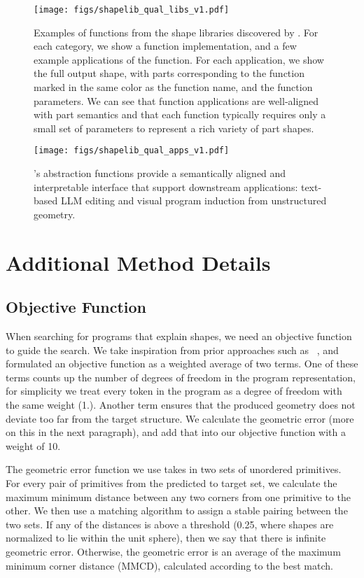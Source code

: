 
\begin{figure*}[t!]
\centering
  \texttt{[image: figs/shapelib\_qual\_libs\_v1.pdf]}
   \caption{Examples of functions from the shape libraries discovered by \methodname. For each category, we show a function implementation, and a few example applications of the function. For each application, we show the full output shape, with parts corresponding to the function marked in the same color as the function name, and the function parameters. We can see that function applications are well-aligned with part semantics and that each function typically requires only a small set of parameters to represent a rich variety of part shapes.} 
  \label{fig:big_qual_libs}
\end{figure*}

\begin{figure*}[t!]
\centering
  \texttt{[image: figs/shapelib\_qual\_apps\_v1.pdf]}
   \caption{\methodname's abstraction functions provide a semantically aligned and interpretable interface that support downstream applications: text-based LLM editing and visual program induction from unstructured geometry. } 
  \label{fig:big_qual_apps}
\end{figure*}


\section{Additional Method Details}

\subsection{Objective Function }

When searching for programs that explain shapes, we need an objective function to guide the search. 
We take inspiration from prior approaches such as ~\cite{jones2023shapecoder}, and formulated an objective function as a weighted average of two terms.
One of these terms counts up the number of degrees of freedom in the program representation, for simplicity we treat every token in the program as a degree of freedom with the same weight (1.).
Another term ensures that the produced geometry does not deviate too far from the target structure. 
We calculate the geometric error (more on this in the next paragraph), and add that into our objective function with a weight of 10.

The geometric error function we use takes in two sets of unordered primitives. 
For every pair of primitives from the predicted to target set, we calculate the maximum minimum distance between any two corners from one primitive to the other. 
We then use a matching algorithm to assign a stable pairing between the two sets.
If any of the distances is above a threshold (0.25, where shapes are normalized to lie within the unit sphere), then we say that there is infinite geometric error.
Otherwise, the geometric error is an average of the maximum minimum corner distance (MMCD), calculated according to the best match.

